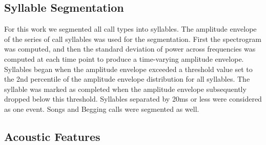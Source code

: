 \subsection{Syllable Segmentation}

For this work we segmented all call types into syllables. The amplitude envelope of the series of call syllables was used for the segmentation. First the spectrogram was computed, and then the standard deviation of power across frequencies was computed at each time point to produce a time-varying amplitude envelope. Syllables began when the amplitude envelope exceeded a threshold value set to the 2nd percentile of the amplitude envelope distribution for all syllables. The syllable was marked as completed when the amplitude envelope subsequently dropped below this threshold. Syllables separated by 20ms or less were considered as one event. Songs and Begging calls were segmented as well. 

\subsection{Acoustic Features}

